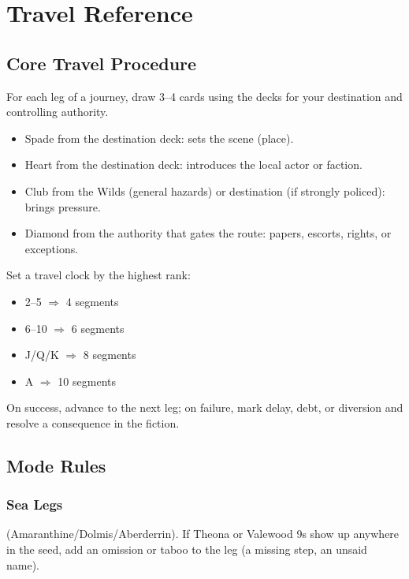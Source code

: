 \chapter{Travel Reference}

\section{Core Travel Procedure}

For each leg of a journey, draw 3--4 cards using the decks for your destination and controlling authority.

\begin{itemize}
\item Spade from the destination deck: sets the scene (place).
\item Heart from the destination deck: introduces the local actor or faction.
\item Club from the Wilds (general hazards) or destination (if strongly policed): brings pressure.
\item Diamond from the authority that gates the route: papers, escorts, rights, or exceptions.
\end{itemize}

Set a travel clock by the highest rank:
\begin{itemize}
\item 2--5 $\Rightarrow$ 4 segments
\item 6--10 $\Rightarrow$ 6 segments
\item J/Q/K $\Rightarrow$ 8 segments
\item A $\Rightarrow$ 10 segments
\end{itemize}

On success, advance to the next leg; on failure, mark delay, debt, or diversion and resolve a consequence in the fiction.

\section{Mode Rules}

\subsection{Sea Legs}
(Amaranthine/Dolmis/Aberderrin). If Theona or Valewood 9s show up anywhere in the seed, add an omission or taboo to the leg (a missing step, an unsaid name).


